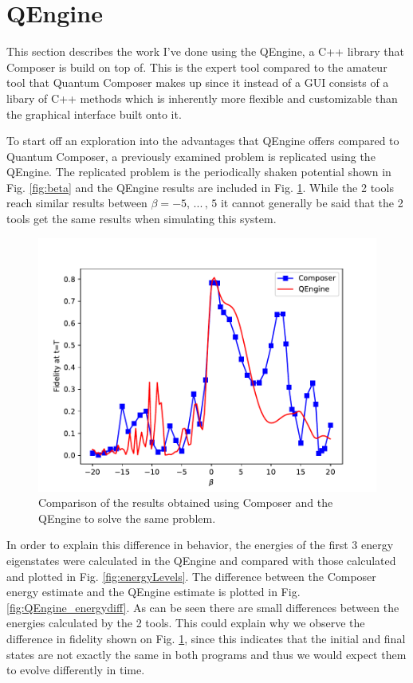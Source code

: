 \documentclass[a4paper, twocolumn]{revtex4-1}
\begin{document}
\section{QEngine}\label{sec:QEngine}
This section describes the work I've done using the QEngine, a C++ library that Composer is build on top of. This is the expert tool compared to the amateur tool that Quantum Composer makes up since it instead of a GUI consists of a libary of C++ methods which is inherently more flexible and customizable than the graphical interface built onto it.

To start off an exploration into the advantages that QEngine offers compared to Quantum Composer, a previously examined problem is replicated using the QEngine. The replicated problem is the periodically shaken potential shown in Fig. \ref{fig:beta} and the QEngine results are included in Fig. \ref{fig:QEngine_nonOPt}. While the 2 tools reach similar results between $\beta = -5, \, ...\, , \, 5$ it cannot generally be said that the 2 tools get the same results when simulating this system.
\begin{figure}
	\includegraphics[width=\columnwidth]{graphics/qengine/comparison.pdf}
	\caption{Comparison of the results obtained using Composer and the QEngine to solve the same problem.}
	\label{fig:QEngine_nonOPt}
\end{figure}

In order to explain this difference in behavior, the energies of the first 3 energy eigenstates were calculated in the QEngine and compared with those calculated and plotted in Fig. \ref{fig:energyLevels}. The difference between the Composer energy estimate and the QEngine estimate is plotted in Fig. \ref{fig:QEngine_energydiff}. As can be seen there are small differences between the energies calculated by the 2 tools. This could explain why we observe the difference in fidelity shown on Fig. \ref{fig:QEngine_nonOPt}, since this indicates that the initial and final states are not exactly the same in both programs and thus we would expect them to evolve differently in time.\\
\end{document}
